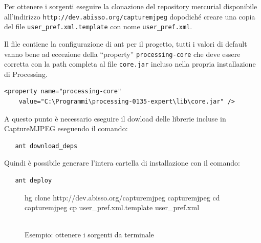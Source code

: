 \documentclass[a4paper,11pt]{article}
\begin{document}
Per ottenere i sorgenti eseguire la clonazione del repository
mercurial disponibile all'indirizzo
\texttt{http://dev.abisso.org/capturemjpeg} 
dopodiché creare una copia del file \texttt{user\_pref.xml.template}
con nome \texttt{user\_pref.xml}.

Il file contiene la configurazione di ant per il progetto, tutti i
valori di default vanno bene ad eccezione della ``property''
\texttt{processing-core} che deve essere corretta con la path completa
al file \texttt{core.jar} incluso nella propria installazione di Processing.
\begin{verbatim}
<property name="processing-core" 
    value="C:\Programmi\processing-0135-expert\lib\core.jar" />
\end{verbatim}

A questo punto è necessario eseguire il dowload delle librerie incluse
in CaptureMJPEG eseguendo il comando:
\begin{verbatim}
   ant download_deps
\end{verbatim}

Quindi è possibile generare l'intera cartella di installazione con
il comando:
\begin{verbatim}
   ant deploy 
\end{verbatim}
\begin{figure}
  \centering
\begin{boxedverbatim}

 hg clone http://dev.abisso.org/capturemjpeg capturemjpeg   
 cd capturemjpeg
 cp user_pref.xml.template user_pref.xml

\end{boxedverbatim}
\\
\vspace{0.3cm}
Esempio: ottenere i sorgenti da terminale
\end{figure}
\end{document}

